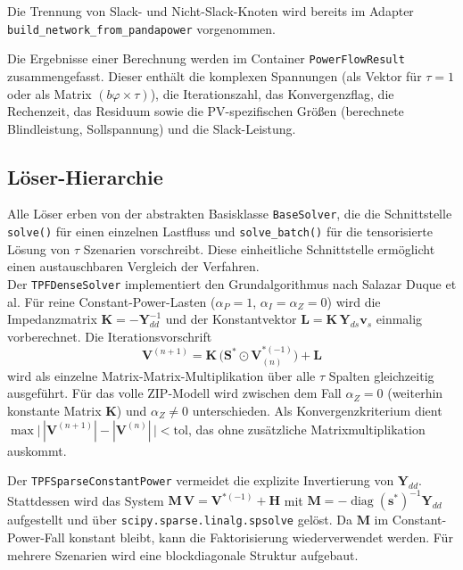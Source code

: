Die Trennung von Slack- und Nicht-Slack-Knoten wird bereits im Adapter
\texttt{build\_network\_from\_pandapower} vorgenommen. 

Die Ergebnisse einer Berechnung werden im Container \texttt{PowerFlowResult}
zusammengefasst. Dieser enthält die komplexen Spannungen (als Vektor für $\tau=1$ oder
als Matrix $(b\varphi \times \tau)$), die Iterationszahl, das Konvergenzflag, die
Rechenzeit, das Residuum sowie die PV-spezifischen Größen (berechnete Blindleistung,
Sollspannung) und die Slack-Leistung.

\subsection{Löser-Hierarchie}

Alle Löser erben von der abstrakten Basisklasse \texttt{BaseSolver}, die die
Schnittstelle \texttt{solve()} für einen einzelnen Lastfluss und \texttt{solve\_batch()}
für die tensorisierte Lösung von $\tau$ Szenarien vorschreibt. Diese einheitliche
Schnittstelle ermöglicht einen austauschbaren Vergleich der Verfahren.\\

Der \texttt{TPFDenseSolver} implementiert den
Grundalgorithmus nach Salazar Duque et al. Für reine Constant-Power-Lasten
($\alpha_P=1$, $\alpha_I=\alpha_Z=0$) wird die Impedanzmatrix
$\mathbf{K}=-\mathbf{Y}_{dd}^{-1}$ und der Konstantvektor
$\mathbf{L}=\mathbf{K}\,\mathbf{Y}_{ds}\mathbf{v}_s$ einmalig vorberechnet. Die
Iterationsvorschrift
\begin{equation}
	\mathbf{V}^{(n+1)} = \mathbf{K}\,\bigl(\mathbf{S}^{*}\odot \mathbf{V}^{*(-1)}_{(n)}\bigr) + \mathbf{L}
	\label{eq:fpi-cp}
\end{equation}
wird als einzelne Matrix-Matrix-Multiplikation über alle $\tau$ Spalten
gleichzeitig ausgeführt. Für das volle ZIP-Modell wird zwischen dem Fall
$\alpha_Z=0$ (weiterhin konstante Matrix $\mathbf{K}$) und $\alpha_Z\neq 0$
unterschieden. Als Konvergenzkriterium dient
$\max\bigl|\,|\mathbf{V}^{(n+1)}|-|\mathbf{V}^{(n)}|\,\bigr| < \text{tol}$,
das ohne zusätzliche Matrixmultiplikation auskommt.

Der \texttt{TPFSparseConstantPower} vermeidet die explizite
Invertierung von $\mathbf{Y}_{dd}$. Stattdessen wird das System
$\mathbf{M}\,\mathbf{V} = \mathbf{V}^{*(-1)} + \mathbf{H}$ mit
$\mathbf{M}=-\operatorname{diag}(\mathbf{s}^{*})^{-1}\mathbf{Y}_{dd}$ aufgestellt und
über \texttt{scipy.sparse.linalg.spsolve} gelöst. Da $\mathbf{M}$ im
Constant-Power-Fall konstant bleibt, kann die Faktorisierung wiederverwendet werden.
Für mehrere Szenarien wird eine blockdiagonale Struktur aufgebaut.

